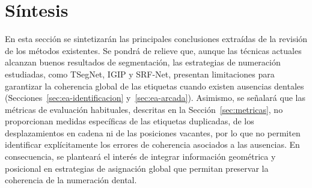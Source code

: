 \section{Síntesis}
\label{sec:ea-sintesis}

En esta sección se sintetizarán las principales conclusiones extraídas de la revisión de los métodos existentes. Se pondrá de relieve que, aunque las técnicas actuales alcanzan buenos resultados de segmentación, las estrategias de numeración estudiadas, como TSegNet, IGIP y SRF-Net, presentan limitaciones para garantizar la coherencia global de las etiquetas cuando existen ausencias dentales (Secciones~\ref{sec:ea-identificacion} y~\ref{sec:ea-arcada}). Asimismo, se señalará que las métricas de evaluación habituales, descritas en la Sección~\ref{sec:metricas}, no proporcionan medidas específicas de las etiquetas duplicadas, de los desplazamientos en cadena ni de las posiciones vacantes, por lo que no permiten identificar explícitamente los errores de coherencia asociados a las ausencias. En consecuencia, se planteará el interés de integrar información geométrica y posicional en estrategias de asignación global que permitan preservar la coherencia de la numeración dental.